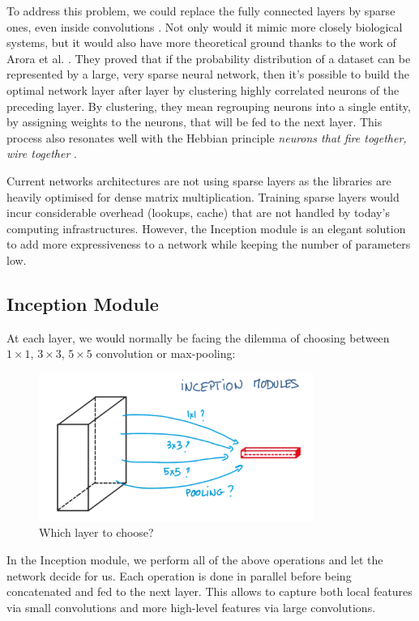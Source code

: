 To address this problem, we could replace the fully connected layers by sparse ones, even inside convolutions \cite{googlenet}. Not only would it mimic more closely biological systems, but it would also have more theoretical ground thanks to the work of Arora et al. \cite{arora}. They proved that if the probability distribution of a dataset can be represented by a large, very sparse neural network, then it's possible to build the optimal network layer after layer by clustering highly correlated neurons of the preceding layer. By clustering, they mean regrouping neurons into a single entity, by assigning weights to the neurons, that will be fed to the next layer.
This process also resonates well with the Hebbian principle {\em neurons that fire together, wire together} \cite{hebbian}.

Current networks architectures are not using sparse layers as the libraries are heavily optimised for dense matrix multiplication. Training sparse layers would incur considerable overhead (lookups, cache) that are not handled by today's computing infrastructures. However, the Inception module is an elegant solution to add more expressiveness to a network while keeping the number of parameters low. 

\subsection{Inception Module}
At each layer, we would normally be facing the dilemma of choosing between $1\times 1$, $3\times 3$, $5\times5$ convolution or max-pooling:

\begin{figure}[H]
    \centering
    \includegraphics[width=0.8\textwidth]{Images/inceptionmodule.png}
    \caption{Which layer to choose? \cite{inceptionmodule}}
\end{figure}

In the Inception module, we perform all of the above operations and let the network decide for us. Each operation is done in parallel before being concatenated and fed to the next layer. This allows to capture both local features via small convolutions and more high-level features via large convolutions. 

